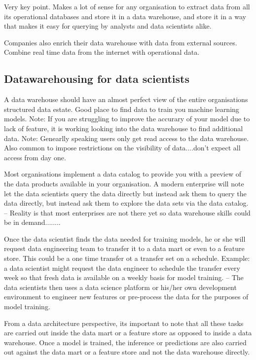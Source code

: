 \documentclass[a4paper, 11pt]{article}
\begin{document}
    Very key point.
    Makes a lot of sense for any organisation to extract data from all its operational databases and store it in a data warehouse,
    and store it in a way that makes it easy for querying by analysts and data scientists alike.

    Companies also enrich their data warehouse with data from external sources.
    Combine real time data from the internet with operational data.

    \subsection{Datawarehousing for data scientists}

    A data warehouse should have an almost perfect view of the entire organisations structured data estate.
    Good place to find data to train you machine learning models.
    Note: If you are struggling to improve the accurary of your model due to lack of feature, it is working looking into the data warehouse to find additional data.
    Note: Genearlly speaking users only get read access to the data warehouse.
    Also common to impose restrictions on the visibility of data....don't expect all access from day one.

    Most organisations implement a data catalog to provide you with a preview of the data products available in your organisation.
    A modern enterprise will note let the data scientists query the data directly but instead ask them to query the data directly, but instead ask them to explore the data sets via the data catalog.
    -- Reality is that most enterprises are not there yet so data warehouse skills could be in demand........

    Once the data scientist finds the data needed for training models, he or she will request data engineering team to transfer it to a data mart or even to a feature store.
    This could be a one time transfer ot a transfer set on a schedule.
    Example: a data scientist might request the data engineer to schedule the transfer every week so that fresh data is available on a weekly basis for model training.
    -- The data scientists then uses a data science platform or his/her own development environment to engineer new features or pre-process the data for the purposes of model training.

    From a data architecture perspective, its important to note that all these tasks are carried out inside the data mart or a feature store as opposed to inside a data warehouse.
    Once a model is trained, the inference or predictions are also carried out against the data mart or a feature store and not the data warehouse directly.
\end{document}
